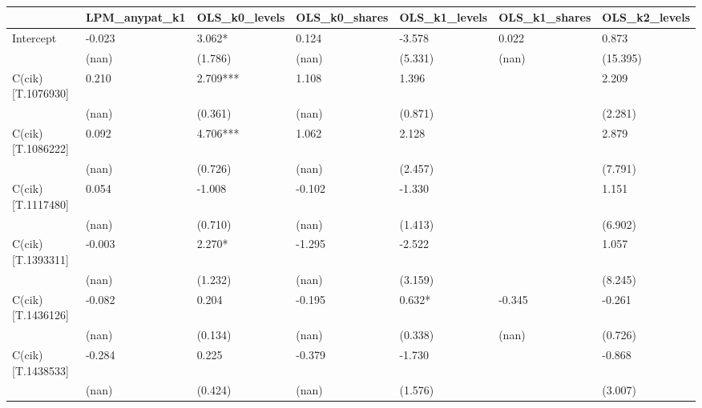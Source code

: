 \begin{table}
\caption{}
\label{}
\begin{center}
\begin{tabular}{lllllll}
\hline
                  & LPM\_anypat\_k1 & OLS\_k0\_levels & OLS\_k0\_shares & OLS\_k1\_levels & OLS\_k1\_shares & OLS\_k2\_levels  \\
\hline
Intercept         & -0.023          & 3.062*          & 0.124           & -3.578          & 0.022           & 0.873            \\
                  & (nan)           & (1.786)         & (nan)           & (5.331)         & (nan)           & (15.395)         \\
C(cik)[T.1076930] & 0.210           & 2.709***        & 1.108           & 1.396           &                 & 2.209            \\
                  & (nan)           & (0.361)         & (nan)           & (0.871)         &                 & (2.281)          \\
C(cik)[T.1086222] & 0.092           & 4.706***        & 1.062           & 2.128           &                 & 2.879            \\
                  & (nan)           & (0.726)         & (nan)           & (2.457)         &                 & (7.791)          \\
C(cik)[T.1117480] & 0.054           & -1.008          & -0.102          & -1.330          &                 & 1.151            \\
                  & (nan)           & (0.710)         & (nan)           & (1.413)         &                 & (6.902)          \\
C(cik)[T.1393311] & -0.003          & 2.270*          & -1.295          & -2.522          &                 & 1.057            \\
                  & (nan)           & (1.232)         & (nan)           & (3.159)         &                 & (8.245)          \\
C(cik)[T.1436126] & -0.082          & 0.204           & -0.195          & 0.632*          & -0.345          & -0.261           \\
                  & (nan)           & (0.134)         & (nan)           & (0.338)         & (nan)           & (0.726)          \\
C(cik)[T.1438533] & -0.284          & 0.225           & -0.379          & -1.730          &                 & -0.868           \\
                  & (nan)           & (0.424)         & (nan)           & (1.576)         &                 & (3.007)          \\

\end{tabular}
\end{center}
\end{table}
